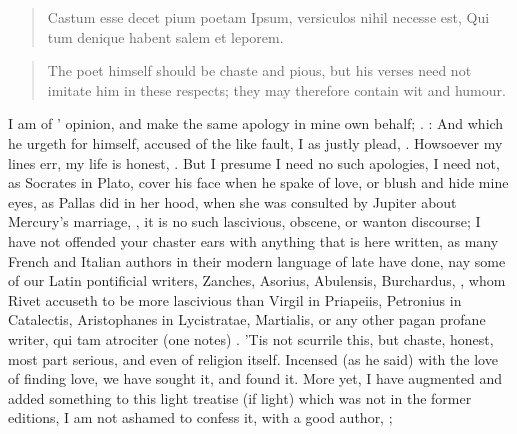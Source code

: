 {\begin{latin}
\begin{verse}%
Castum esse decet pium poetam
Ipsum, versiculos nihil necesse est,
Qui tum denique habent salem et leporem.
\end{verse}%
\end{latin}
\translationrule%
\begin{verse}%
The poet himself should be chaste and pious,
but his verses need not imitate him in these respects;
they may therefore contain wit and humour.
\end{verse}%

I am of \Catullus{}' opinion, and make the same apology in mine own
behalf; .  : And which he urgeth for himself,
accused of the like fault, I as justly plead, . Howsoever my lines err, my life is honest,
. But I presume I need no
such apologies, I need not, as Socrates in Plato, cover his face when
he spake of love, or blush and hide mine eyes, as Pallas did in her
hood, when she was consulted by Jupiter about Mercury's marriage, , it is no such lascivious, obscene, or
wanton discourse; I have not offended your chaster ears with anything
that is here written, as many French and Italian authors in their
modern language of late have done, nay some of our Latin pontificial
writers, Zanches, Asorius, Abulensis, Burchardus, \etc{}, whom Rivet
accuseth to be more lascivious than Virgil in Priapeiis, Petronius in
Catalectis, Aristophanes in Lycistratae, Martialis, or any other pagan
profane writer, qui tam atrociter (one notes) . 'Tis not scurrile this, but chaste, honest, most
part serious, and even of religion itself. Incensed (as he said)
with the love of finding love, we have sought it, and found it. More
yet, I have augmented and added something to this light treatise (if
light) which was not in the former editions, I am not ashamed to
confess it, with a good author, ;

}
